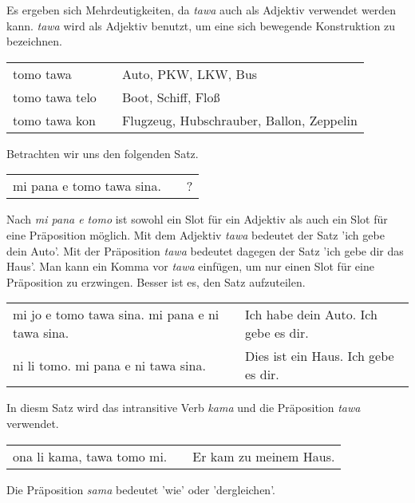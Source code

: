 %
Es ergeben sich Mehrdeutigkeiten, da \textit{tawa} auch als Adjektiv verwendet werden kann. 
\textit{tawa} wird als Adjektiv benutzt, um eine sich bewegende Konstruktion zu bezeichnen. 

\begin{supertabular}{p{5,5cm}|ll}
tomo tawa && Auto, PKW, LKW, Bus \\
tomo tawa telo && Boot, Schiff, Floß \\
tomo tawa kon && Flugzeug, Hubschrauber, Ballon, Zeppelin \\
\end{supertabular} 

Betrachten wir uns den folgenden Satz.

\begin{supertabular}{p{5,5cm}|ll}
mi pana e tomo tawa sina. && ? \\   %
\end{supertabular} 

Nach \textit{mi pana e tomo} ist sowohl ein Slot für ein Adjektiv als auch ein Slot für eine Präposition möglich. 
Mit dem Adjektiv \textit{tawa} bedeutet der Satz 'ich gebe dein Auto'. 
Mit der Präposition \textit{tawa} bedeutet dagegen der Satz 'ich gebe dir das Haus'. 
Man kann ein Komma vor \textit{tawa} einfügen, um nur einen Slot für eine Präposition zu erzwingen. 
Besser ist es, den Satz aufzuteilen. 

\begin{supertabular}{p{5,5cm}|ll}
mi jo e tomo tawa sina. mi pana e ni tawa sina. && Ich habe dein Auto. Ich gebe es dir. \\
ni li tomo. mi pana e ni tawa sina. && Dies ist ein Haus. Ich gebe es dir. \\
\end{supertabular} 

%
%
In diesm Satz wird das intransitive Verb \textit{kama} und die Präposition \textit{tawa} verwendet.

\begin{supertabular}{p{5,5cm}|ll}
ona li kama, tawa tomo mi. && Er kam zu meinem Haus. \\
\end{supertabular} 

%
%
Die Präposition \textit{sama} bedeutet 'wie' oder 'dergleichen'.

